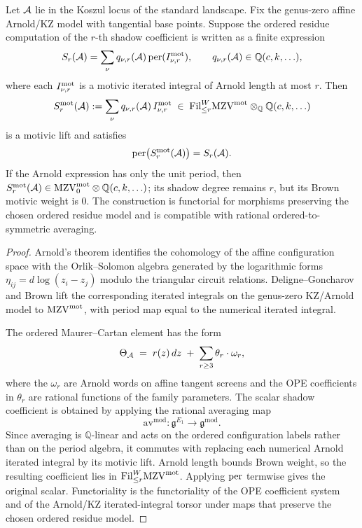 \begin{theorem}
\ClaimStatusProvedHere
Let $\mathcal{A}$ lie in the Koszul locus of the standard landscape. Fix the
genus-zero affine Arnold/KZ model with tangential base points. Suppose
the ordered residue computation of the $r$-th shadow coefficient is
written as a finite expression
\[
 S_r(\mathcal{A})=\sum_{\nu} q_{\nu,r}(\mathcal{A})\,\mathrm{per}(I_{\nu,r}^{\mathrm{mot}}),
 \qquad q_{\nu,r}(\mathcal{A})\in\mathbb Q(c,k,\ldots),
\]
where each $I_{\nu,r}^{\mathrm{mot}}$ is a motivic iterated integral of Arnold
length at most $r$. Then
\[
 S_r^{\mathrm{mot}}(\mathcal{A}):=\sum_{\nu} q_{\nu,r}(\mathcal{A})\,I_{\nu,r}^{\mathrm{mot}}
 \;\in\;
 \mathrm{Fil}^W_{\le r}\mathrm{MZV}^{\mathrm{mot}}\otimes_{\mathbb Q}\mathbb Q(c,k,\ldots)
\]
is a motivic lift and satisfies
\[
 \mathrm{per}\bigl(S_r^{\mathrm{mot}}(\mathcal{A})\bigr)=S_r(\mathcal{A}).
\]
If the Arnold expression has only the unit period, then
$S_r^{\mathrm{mot}}(\mathcal{A})\in \mathrm{MZV}^{\mathrm{mot}}_0\otimes\mathbb Q(c,k,\ldots)$; its
shadow degree remains $r$, but its Brown motivic weight is $0$.
The construction is functorial for morphisms preserving the chosen
ordered residue model and is compatible with rational
ordered-to-symmetric averaging.
\end{theorem}

\begin{proof}
Arnold's theorem identifies the cohomology of the affine configuration
space with the Orlik--Solomon algebra generated by the logarithmic
forms $\eta_{ij}=d\log(z_i-z_j)$ modulo the triangular circuit
relations. Deligne--Goncharov and Brown lift the corresponding
iterated integrals on the genus-zero KZ/Arnold model to
$\mathrm{MZV}^{\mathrm{mot}}$, with period map equal to the numerical iterated
integral.

The ordered Maurer--Cartan element has the form
\[
 \Theta_{\mathcal{A}} \;=\; r(z) \,dz
 \;+\; \sum_{r \geq 3} \theta_r \cdot \omega_r,
\]
where the $\omega_r$ are Arnold words on affine tangent screens and
the OPE coefficients in $\theta_r$ are rational functions of the
family parameters. The scalar shadow coefficient is obtained by
applying the rational averaging map
\[
 \mathrm{av}^{\mathrm{mod}}
 \colon \mathfrak{g}^{E_1} \longrightarrow \mathfrak{g}^{\mathrm{mod}}.
\]
Since averaging is $\mathbb Q$-linear and acts on the ordered
configuration labels rather than on the period algebra, it commutes
with replacing each numerical Arnold iterated integral by its motivic
lift. Arnold length bounds Brown weight, so the resulting coefficient
lies in $\mathrm{Fil}^W_{\le r}\mathrm{MZV}^{\mathrm{mot}}$. Applying $\mathrm{per}$ termwise gives
the original scalar. Functoriality is the functoriality of the OPE
coefficient system and of the Arnold/KZ iterated-integral torsor under
maps that preserve the chosen ordered residue model.
\end{proof}

